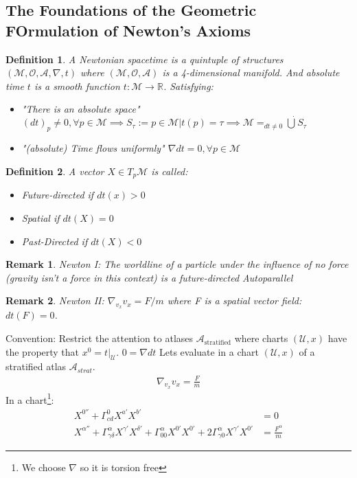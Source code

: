 \documentclass[10pt, oneside]{article}
\newcommand{\R}{\mathbb{R}}
\newcommand{\M}{\mathcal{M}}
\newtheorem{defn}{Definition}
\newtheorem{remark}{Remark}
\begin{document}
     \subsection{The Foundations of the Geometric FOrmulation of Newton's Axioms}
     \begin{defn}
     A Newtonian spacetime is a quintuple of structures $(\M,\mathcal{O},\mathcal{A},\nabla,t)$ where $(\M,\mathcal{O},\mathcal{A})$ is a 4-dimensional manifold. And absolute time $t$ is a smooth function $t:\M \to \R$. Satisfying:
     \begin{itemize}
        \item "There is an absolute space" $(dt)_p \not = 0, \forall p \in \M \implies S_\tau := {p \in \M | t(p) = \tau} \implies \M =_{dt\not = 0} \dot{\bigcup} S_\tau$
        \item "(absolute) Time flows uniformly" $\nabla dt = 0, \forall p \in \M$
     \end{itemize}
     \end{defn}
     \begin{defn}
     A vector $X \in T_p \M$ is called:
     \begin{itemize}
     \item Future-directed if $dt(x) > 0$
     \item Spatial if $dt(X) = 0$
     \item Past-Directed if $dt(X) < 0$
     \end{itemize}
     \end{defn}
     \begin{remark}
     Newton I: The worldline of a particle under the influence of no force (gravity isn't a force in this context) is a future-directed Autoparallel
     \end{remark}
     \begin{remark}
     Newton II: $\nabla_{v_{x}} v_x = F/m$ where F is a spatial vector field: $dt(F) = 0$.
     \end{remark}
     Convention: Restrict the attention to atlases $\mathcal{A}_{\text{stratified}}$ where charts $(\mathcal{U},x)$ have the property that $x^0 = t|_{\mathcal{U}}$. $0 = \nabla dt$
     Lets evaluate in a chart $(\mathcal{U},x)$ of a stratified atlas $\mathcal{A}_{strat}$.
     \begin{align*}
        \nabla_{v_{x}} v_{x} = \frac{F}{m}
     \end{align*}
     In a chart\footnote{We choose $\nabla$ so it is torsion free}:
     \begin{align*}
        X^{0''} + \Gamma^0_{cd} X^{a'} X^{b'} &= 0 \\
        X^{\alpha''} + \Gamma^\alpha_{\gamma \delta} X^{\gamma'} X^{\delta'} + \Gamma^\alpha_{00} X^{0'} X^{0'} + 2 \Gamma^\alpha_{\gamma 0} X^{\gamma'} X^{0'} & = \frac{F^\alpha}{m}
     \end{align*}
\end{document}
